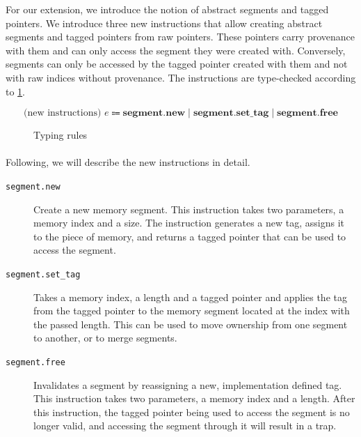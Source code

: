 For our extension, we introduce the notion of abstract segments and tagged pointers.
We introduce three new instructions that allow creating abstract segments and tagged pointers from raw pointers.
These pointers carry provenance with them and can only access the segment they were created with.
Conversely, segments can only be accessed by the tagged pointer created with them and not with raw indices without provenance.
The instructions are type-checked according to \cref{fig:typing-rules}.

\begin{equation*}
    \text{(new instructions) } e \Coloneqq \textbf{segment.new} \mid \textbf{segment.set\_tag} \mid \textbf{segment.free}
\end{equation*}


\begin{figure}[t]
    \begin{prooftree}
    \end{prooftree}
    \begin{prooftree}
    \end{prooftree}
    \begin{prooftree}
    \end{prooftree}
    \caption{Typing rules}
    \label{fig:typing-rules}
\end{figure}

\paragraph{}
Following, we will describe the new instructions in detail.

\begin{description}
    \item[\texttt{segment.new}] Create a new memory segment.
    This instruction takes two parameters, a memory index and a size.
    The instruction generates a new tag, assigns it to the piece of memory, and returns a tagged pointer that can be used to access the segment.
    \item[\texttt{segment.set\_tag}] Takes a memory index, a length and a tagged pointer and applies the tag from the tagged pointer to the memory segment located at the index with the passed length.
    This can be used to move ownership from one segment to another, or to merge segments.
    \item[\texttt{segment.free}] Invalidates a segment by reassigning a new, implementation defined tag.
    This instruction takes two parameters, a memory index and a length.
    After this instruction, the tagged pointer being used to access the segment is no longer valid, and accessing the segment through it will result in a trap.
\end{description}

